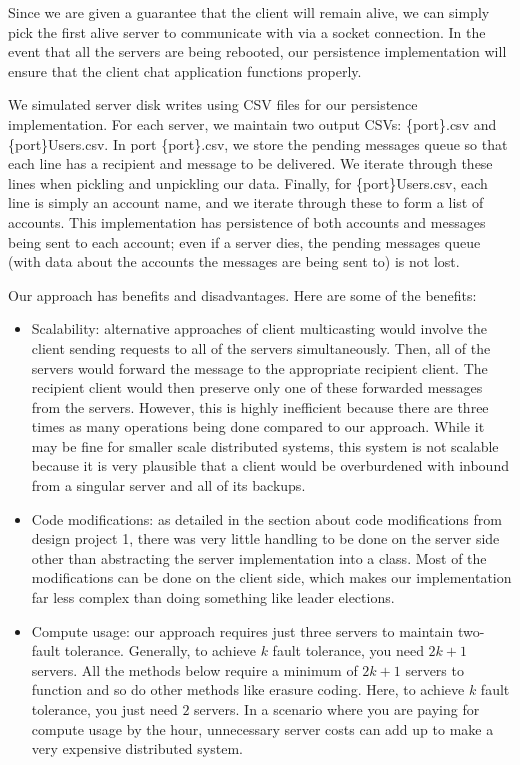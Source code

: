\documentclass[
	a4paper, %
	10pt, %
	unnumberedsections, %
	twoside, %
]{LTJournalArticle}
\begin{document}
Since we are given a guarantee that the client will remain alive, we can simply pick the first alive server to communicate with via a socket connection. In the event that all the servers are being rebooted, our persistence implementation will ensure that the client chat application functions properly. 

We simulated server disk writes using CSV files for our persistence implementation. For each server, we maintain two output CSVs: \{port\}.csv and \{port\}Users.csv. In port \{port\}.csv, we store the pending messages queue so that
each line has a recipient and message to be delivered. 
We iterate through these lines when pickling and unpickling our data. Finally, for \{port\}Users.csv, each line is simply an account name, and we iterate through these to form a list of accounts. This implementation has persistence of both accounts and messages being sent to each account; even if a server dies, the pending messages queue (with data about the accounts the messages are being sent to) is not lost.

Our approach has benefits and disadvantages. Here are some of the benefits: 
\begin{itemize}
    \item Scalability: alternative approaches of client multicasting would involve the client sending requests to all of the servers simultaneously. Then, all of the servers would forward the message to the appropriate recipient client. The recipient client would then preserve only one of these forwarded messages from the servers. However, this is highly inefficient because there are three times as many operations being done compared to our approach. While it may be fine for smaller scale distributed systems, this system is not scalable because it is very plausible that a client would be overburdened with inbound from a singular server and all of its backups. 
    \item Code modifications: as detailed in the section about code modifications from design project 1, there was very little handling to be done on the server side other than abstracting the server implementation into a class. Most of the modifications can be done on the client side, which makes our implementation far less complex than doing something like leader elections. 
    \item Compute usage: our approach requires just three servers to maintain two-fault tolerance. Generally, to achieve $k$ fault tolerance, you need $2k + 1$ servers. All the methods below require a minimum of $2k + 1$ servers to function and so do other methods like erasure coding. Here, to achieve $k$ fault tolerance, you just need $2$ servers. In a scenario where you are paying for compute usage by the hour, unnecessary server costs can add up to make a very expensive distributed system. 
\end{itemize}
\end{document}
